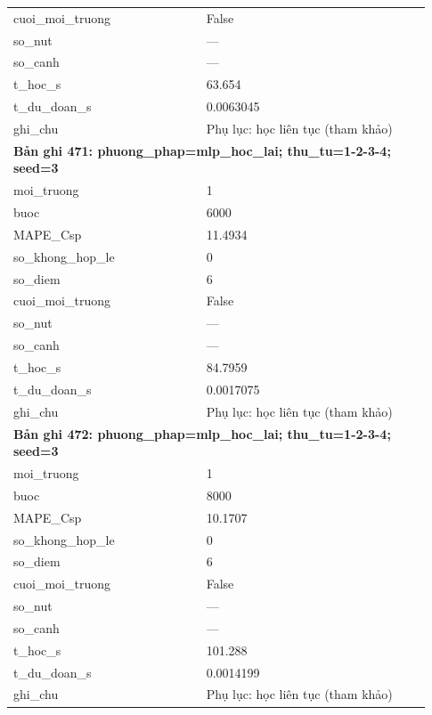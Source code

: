 \begin{longtable}{p{0.43\linewidth}p{0.50\linewidth}}
cuoi\_\allowbreak moi\_\allowbreak truong & False \\
so\_\allowbreak nut & — \\
so\_\allowbreak canh & — \\
t\_\allowbreak hoc\_\allowbreak s & 63.654 \\
t\_\allowbreak du\_\allowbreak doan\_\allowbreak s & 0.0063045 \\
ghi\_\allowbreak chu & Phụ lục: học liên tục (tham khảo) \\
\midrule
\multicolumn{2}{p{0.95\linewidth}}{\textbf{Bản ghi 471: phuong\_phap=mlp\_hoc\_lai; thu\_tu=1-2-3-4; seed=3}} \\
moi\_\allowbreak truong & 1 \\
buoc & 6000 \\
MAPE\_\allowbreak Csp & 11.4934 \\
so\_\allowbreak khong\_\allowbreak hop\_\allowbreak le & 0 \\
so\_\allowbreak diem & 6 \\
cuoi\_\allowbreak moi\_\allowbreak truong & False \\
so\_\allowbreak nut & — \\
so\_\allowbreak canh & — \\
t\_\allowbreak hoc\_\allowbreak s & 84.7959 \\
t\_\allowbreak du\_\allowbreak doan\_\allowbreak s & 0.0017075 \\
ghi\_\allowbreak chu & Phụ lục: học liên tục (tham khảo) \\
\midrule
\multicolumn{2}{p{0.95\linewidth}}{\textbf{Bản ghi 472: phuong\_phap=mlp\_hoc\_lai; thu\_tu=1-2-3-4; seed=3}} \\
moi\_\allowbreak truong & 1 \\
buoc & 8000 \\
MAPE\_\allowbreak Csp & 10.1707 \\
so\_\allowbreak khong\_\allowbreak hop\_\allowbreak le & 0 \\
so\_\allowbreak diem & 6 \\
cuoi\_\allowbreak moi\_\allowbreak truong & False \\
so\_\allowbreak nut & — \\
so\_\allowbreak canh & — \\
t\_\allowbreak hoc\_\allowbreak s & 101.288 \\
t\_\allowbreak du\_\allowbreak doan\_\allowbreak s & 0.0014199 \\
ghi\_\allowbreak chu & Phụ lục: học liên tục (tham khảo) \\

\end{longtable}
